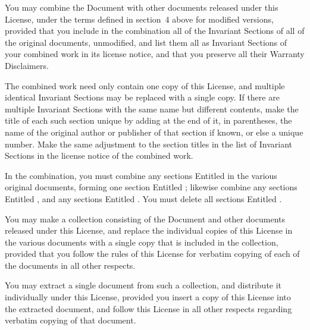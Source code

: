 You may combine the Document with other documents released under this
License, under the terms defined in section~4 above for modified
versions, provided that you include in the combination all of the
Invariant Sections of all of the original documents, unmodified, and
list them all as Invariant Sections of your combined work in its
license notice, and that you preserve all their Warranty Disclaimers.

The combined work need only contain one copy of this License, and
multiple identical Invariant Sections may be replaced with a single
copy.  If there are multiple Invariant Sections with the same name but
different contents, make the title of each such section unique by
adding at the end of it, in parentheses, the name of the original
author or publisher of that section if known, or else a unique number.
Make the same adjustment to the section titles in the list of
Invariant Sections in the license notice of the combined work.

In the combination, you must combine any sections Entitled 
in the various original documents, forming one section Entitled
; likewise combine any sections Entitled ,
and any sections Entitled .  You must delete all sections
Entitled .

\stopalignment

You may make a collection consisting of the Document and other documents
released under this License, and replace the individual copies of this
License in the various documents with a single copy that is included in
the collection, provided that you follow the rules of this License for
verbatim copying of each of the documents in all other respects.

You may extract a single document from such a collection, and distribute
it individually under this License, provided you insert a copy of this
License into the extracted document, and follow this License in all
other respects regarding verbatim copying of that document.


\stopalignment


